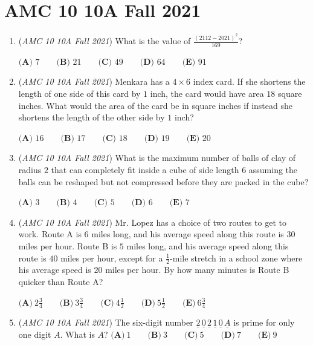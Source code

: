 \section{AMC 10 10A Fall 2021}
        \begin{enumerate}
        	\item (\textit{AMC 10 10A Fall 2021}) What is the value of $\frac{(2112-2021)^2}{169}$?


 $\textbf{(A) } 7 \qquad\textbf{(B) } 21 \qquad\textbf{(C) } 49 \qquad\textbf{(D) } 64 \qquad\textbf{(E) } 91$


	\item (\textit{AMC 10 10A Fall 2021}) Menkara has a $4 \times 6$ index card. If she shortens the length of one side of this card by $1$ inch, the card would have area $18$ square inches. What would the area of the card be in square inches if instead she shortens the length of the other side by $1$ inch?


 $\textbf{(A) }16\qquad\textbf{(B) }17\qquad\textbf{(C) }18\qquad\textbf{(D) }19\qquad\textbf{(E) }20$


	\item (\textit{AMC 10 10A Fall 2021}) What is the maximum number of balls of clay of radius $2$ that can completely fit inside a cube of side length $6$ assuming the balls can be reshaped but not compressed before they are packed in the cube?


 $\textbf{(A) }3\qquad\textbf{(B) }4\qquad\textbf{(C) }5\qquad\textbf{(D) }6\qquad\textbf{(E) }7$


	\item (\textit{AMC 10 10A Fall 2021}) Mr. Lopez has a choice of two routes to get to work. Route A is $6$ miles long, and his average speed along this route is $30$ miles per hour. Route B is $5$ miles long, and his average speed along this route is $40$ miles per hour, except for a $\frac{1}{2}$-mile stretch in a school zone where his average speed is $20$ miles per hour. By how many minutes is Route B quicker than Route A?


 $\textbf{(A)}\ 2 \frac{3}{4}  \qquad\textbf{(B)}\  3 \frac{3}{4} \qquad\textbf{(C)}\  4 \frac{1}{2} \qquad\textbf{(D)}\  5 \frac{1}{2} \qquad\textbf{(E)}\ 6 \frac{3}{4}$


	\item (\textit{AMC 10 10A Fall 2021}) The six-digit number $\underline{2}\,\underline{0}\,\underline{2}\,\underline{1}\,\underline{0}\,\underline{A}$ is prime for only one digit $A.$ What is $A?$
$\textbf{(A)}\ 1 \qquad\textbf{(B)}\ 3 \qquad\textbf{(C)}\ 5 \qquad\textbf{(D)}\ 7 \qquad\textbf{(E)}\ 9$



\end{enumerate}

